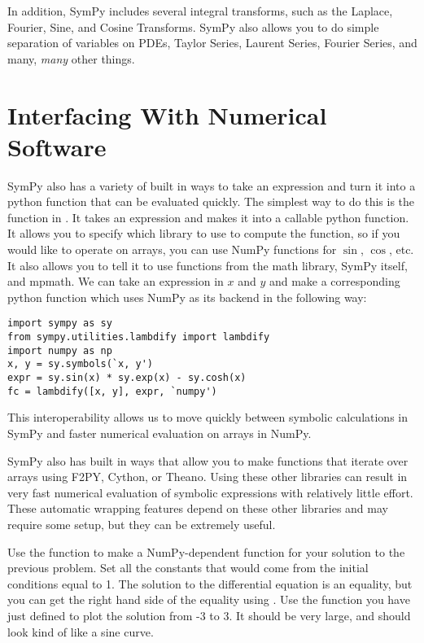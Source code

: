 In addition, SymPy includes several integral transforms, such as the Laplace, Fourier, Sine, and Cosine Transforms.
SymPy also allows you to do simple separation of variables on PDEs, Taylor Series, Laurent Series, Fourier Series, and many, \textit{many} other things.

\section*{Interfacing With Numerical Software}
SymPy also has a variety of built in ways to take an expression and turn it into a python function that can be evaluated quickly.
The simplest way to do this is the  function in .
It takes an expression and makes it into a callable python function. 
It allows you to specify which library to use to compute the function, so if you would like to operate on arrays, you can use NumPy functions for $\sin$, $\cos$, etc.
It also allows you to tell it to use functions from the math library, SymPy itself, and mpmath.
We can take an expression in $x$ and $y$ and make a corresponding python function  which uses NumPy as its backend in the following way:
\begin{lstlisting}
import sympy as sy
from sympy.utilities.lambdify import lambdify
import numpy as np
x, y = sy.symbols(`x, y')
expr = sy.sin(x) * sy.exp(x) - sy.cosh(x)
fc = lambdify([x, y], expr, `numpy')
\end{lstlisting}
This interoperability allows us to move quickly between symbolic calculations in SymPy and faster numerical evaluation on arrays in NumPy.

SymPy also has built in ways that allow you to make functions that iterate over arrays using F2PY, Cython, or Theano.
Using these other libraries can result in very fast numerical evaluation of symbolic expressions with relatively little effort.
These automatic wrapping features depend on these other libraries and may require some setup, but they can be extremely useful.

\begin{problem}
Use the  function to make a NumPy-dependent function for your solution to the previous problem. Set all the constants that would come from the initial conditions equal to 1.
The solution to the differential equation is an equality, but you can get the right hand side of the equality using .
Use the function you have just defined to plot the solution from -3 to 3. 
It should be very large, and should look kind of like a sine curve.
\end{problem}

